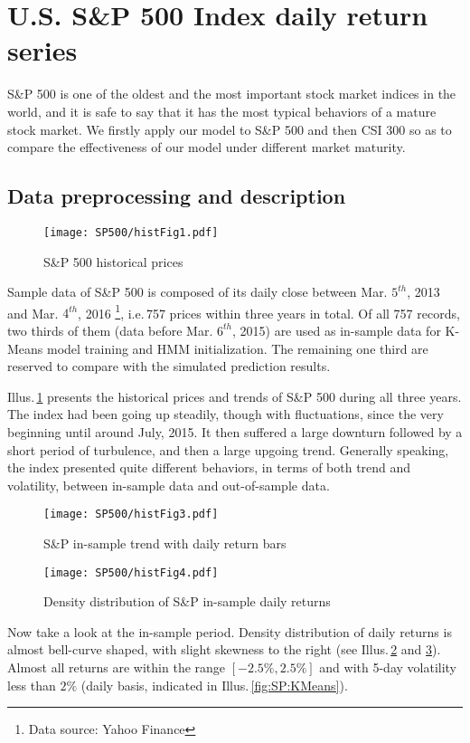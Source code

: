 
\section{U.S. S\&P 500 Index daily return series}
\label{sec:positive:SP}
S\&P 500 is one of the oldest and the most important stock market indices in the world, 
and it is safe to say that it has the most typical behaviors of a mature stock market. 
We firstly apply our model to S\&P 500 and then CSI 300 so as to 
compare the effectiveness of our model under different market maturity.


\subsection{Data preprocessing and description}
\label{sec:positive:SP:data}

        \begin{figure}[!hbt]
        \center
        \texttt{[image: SP500/histFig1.pdf]}
        \caption{S\&P 500 historical prices}
        \label{fig:SP:hist}
        \end{figure}
Sample data of S\&P 500 is composed of its daily close 
between Mar. $5^{th}$, 2013 and Mar. $4^{th}$, 2016
\footnote{Data source: Yahoo Finance},
i.e.\,757 prices within three years in total. 
Of all 757 records, two thirds of them (data before Mar. $6^{th}$, 2015) are used as in-sample data
for K-Means model training and HMM initialization. 
The remaining one third are reserved to compare with the simulated prediction results.

Illus.\,\ref{fig:SP:hist} presents the historical prices and trends of S\&P 500 during all three years. 
The index had been going up steadily, though with fluctuations, 
since the very beginning until around July, 2015. 
It then suffered a large downturn followed by a short period of turbulence, 
and then a large upgoing trend.
Generally speaking, the index presented quite different behaviors, 
in terms of both trend and volatility, between in-sample data and out-of-sample data.

        \begin{figure}[!hbt]
        \center
        \texttt{[image: SP500/histFig3.pdf]}
        \caption{S\&P in-sample trend with daily return bars}
        \label{fig:SP:histin}
        \end{figure}

        \begin{figure}[!hbt]
        \center
        \texttt{[image: SP500/histFig4.pdf]}
        \caption{Density distribution of S\&P in-sample daily returns}
        \label{fig:SP:ret}
        \end{figure}
Now take a look at the in-sample period.
Density distribution of daily returns is almost bell-curve shaped,
with slight skewness to the right (see Illus.\,\ref{fig:SP:histin} and \ref{fig:SP:ret}). 
Almost all returns are within the range $[-2.5\%,2.5\%]$ and 
with 5-day volatility less than $2\%$ (daily basis, indicated in Illus.\,\ref{fig:SP:KMeans}).

